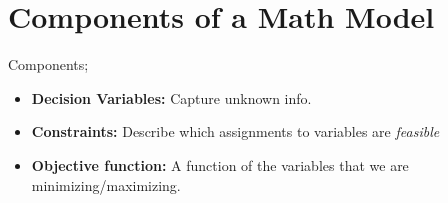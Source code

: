 \documentclass[11pt,oneside]{book} %
\begin{document}
		\section{Components of a Math Model}
		\begin{defn*}
			Components;
			\begin{itemize}
				\item \textbf{Decision Variables: } Capture unknown info.
				\item \textbf{Constraints:} Describe which assignments to variables are \emph{feasible}
				\item \textbf{Objective function: }A function of the variables that we are minimizing/maximizing.
			\end{itemize}

		\end{defn*}
		




\end{document}
